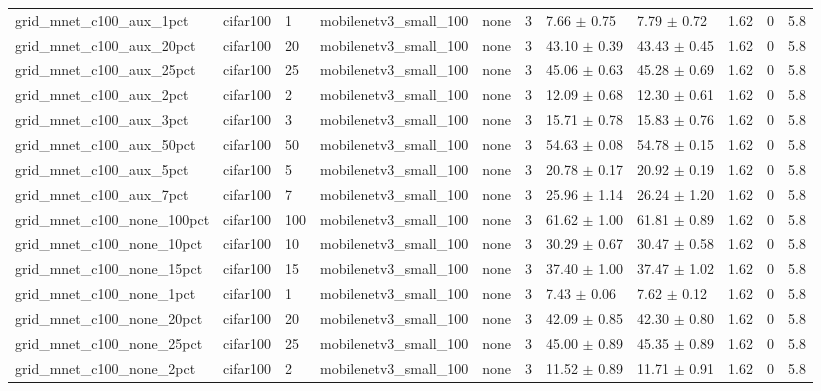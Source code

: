 \begin{tabular}{lllllllllll}
grid_mnet_c100_aux_1pct & cifar100 & 1 & mobilenetv3_small_100 & none & 3 & 7.66 $\pm$ 0.75 & 7.79 $\pm$ 0.72 & 1.62 & 0 & 5.8 \\
grid_mnet_c100_aux_20pct & cifar100 & 20 & mobilenetv3_small_100 & none & 3 & 43.10 $\pm$ 0.39 & 43.43 $\pm$ 0.45 & 1.62 & 0 & 5.8 \\
grid_mnet_c100_aux_25pct & cifar100 & 25 & mobilenetv3_small_100 & none & 3 & 45.06 $\pm$ 0.63 & 45.28 $\pm$ 0.69 & 1.62 & 0 & 5.8 \\
grid_mnet_c100_aux_2pct & cifar100 & 2 & mobilenetv3_small_100 & none & 3 & 12.09 $\pm$ 0.68 & 12.30 $\pm$ 0.61 & 1.62 & 0 & 5.8 \\
grid_mnet_c100_aux_3pct & cifar100 & 3 & mobilenetv3_small_100 & none & 3 & 15.71 $\pm$ 0.78 & 15.83 $\pm$ 0.76 & 1.62 & 0 & 5.8 \\
grid_mnet_c100_aux_50pct & cifar100 & 50 & mobilenetv3_small_100 & none & 3 & 54.63 $\pm$ 0.08 & 54.78 $\pm$ 0.15 & 1.62 & 0 & 5.8 \\
grid_mnet_c100_aux_5pct & cifar100 & 5 & mobilenetv3_small_100 & none & 3 & 20.78 $\pm$ 0.17 & 20.92 $\pm$ 0.19 & 1.62 & 0 & 5.8 \\
grid_mnet_c100_aux_7pct & cifar100 & 7 & mobilenetv3_small_100 & none & 3 & 25.96 $\pm$ 1.14 & 26.24 $\pm$ 1.20 & 1.62 & 0 & 5.8 \\
grid_mnet_c100_none_100pct & cifar100 & 100 & mobilenetv3_small_100 & none & 3 & 61.62 $\pm$ 1.00 & 61.81 $\pm$ 0.89 & 1.62 & 0 & 5.8 \\
grid_mnet_c100_none_10pct & cifar100 & 10 & mobilenetv3_small_100 & none & 3 & 30.29 $\pm$ 0.67 & 30.47 $\pm$ 0.58 & 1.62 & 0 & 5.8 \\
grid_mnet_c100_none_15pct & cifar100 & 15 & mobilenetv3_small_100 & none & 3 & 37.40 $\pm$ 1.00 & 37.47 $\pm$ 1.02 & 1.62 & 0 & 5.8 \\
grid_mnet_c100_none_1pct & cifar100 & 1 & mobilenetv3_small_100 & none & 3 & 7.43 $\pm$ 0.06 & 7.62 $\pm$ 0.12 & 1.62 & 0 & 5.8 \\
grid_mnet_c100_none_20pct & cifar100 & 20 & mobilenetv3_small_100 & none & 3 & 42.09 $\pm$ 0.85 & 42.30 $\pm$ 0.80 & 1.62 & 0 & 5.8 \\
grid_mnet_c100_none_25pct & cifar100 & 25 & mobilenetv3_small_100 & none & 3 & 45.00 $\pm$ 0.89 & 45.35 $\pm$ 0.89 & 1.62 & 0 & 5.8 \\
grid_mnet_c100_none_2pct & cifar100 & 2 & mobilenetv3_small_100 & none & 3 & 11.52 $\pm$ 0.89 & 11.71 $\pm$ 0.91 & 1.62 & 0 & 5.8 \\

\end{tabular}
